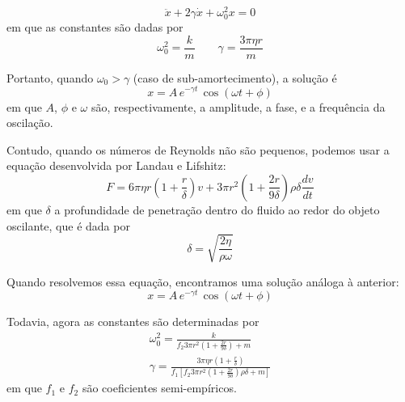 \documentclass[a4paper, 12pt]{article}
\begin{document}
\begin{multicols}{2}
			\begin{equation}
				\ddot{x} + 2 \gamma \dot{x} + \omega_0^2 x = 0
			\end{equation}
			em que as constantes são dadas por
			\begin{equation}
				\omega_0^2 = \frac{k}{m} \qquad \gamma = \frac{3 \pi \eta r}{m}
			\end{equation}
			\par Portanto, quando $\omega_0 > \gamma$ (caso de sub-amortecimento), a solução é
			\begin{equation}
				x = A \, e^{- \gamma t} \, \cos (\omega t + \phi)
			\end{equation}
			em que $A$, $\phi$ e $\omega$ são, respectivamente, a amplitude, a fase, e a frequência da oscilação.
			\par Contudo, quando os números de Reynolds não são pequenos, podemos usar a equação desenvolvida por Landau e Lifshitz:
			\small \begin{equation}
				F = 6 \pi \eta r \left(1 + \frac{r}{\delta} \right) v + 3 \pi r^2 \left( 1 + \frac{2 r}{9 \delta} \right) \rho \delta \dfrac{d v}{d t}
			\end{equation} \normalsize
			em que $\delta$ a profundidade de penetração dentro do fluido ao redor do objeto oscilante, que é dada por
			\begin{equation}
				\delta = \sqrt{\frac{2 \eta}{\rho \omega}}
			\end{equation}
			\par Quando resolvemos essa equação, encontramos uma solução análoga à anterior:
			\begin{equation}
				x = A \, e^{- \gamma t} \, \cos (\omega t + \phi)
			\end{equation}
			\par Todavia, agora as constantes são determinadas por
			\begin{equation} \begin{split}
				\omega_0^2 = \frac{k}{f_2 3 \pi r^2 \left(1 + \frac{2 r}{9 \delta} \right) + m} \\
				\gamma = \frac{3 \pi \eta r \left(1+ \frac{r}{\delta} \right)}{f_1 \left[ f_2 3 \pi r^2 \left(1+\frac{2 r}{9 \delta} \right) \rho \delta + m \right]}
			\end{split} \end{equation}
			em que $f_1$ e $f_2$ são coeficientes semi-empíricos.
			

\end{multicols}
\end{document}
